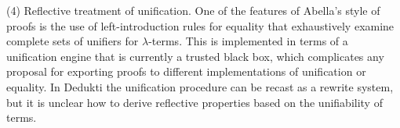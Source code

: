 (4) Reflective treatment of unification. One of the features of
Abella's style of proofs is the use of left-introduction rules for
equality that exhaustively examine complete sets of unifiers for
$\lambda$-terms. This is implemented in terms of a unification engine
that is currently a trusted black box, which complicates any proposal
for exporting proofs to different implementations of unification or
equality. In Dedukti the unification procedure can be recast as a
rewrite system, but it is unclear how to derive reflective properties
based on the unifiability of terms.

